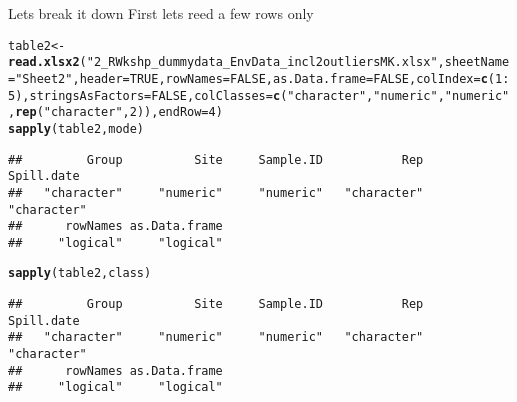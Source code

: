 \documentclass{article}\usepackage[]{graphicx}\usepackage[]{color}
\makeatletter
\newcommand{\hlnum}[1]{\textcolor[rgb]{0.686,0.059,0.569}{#1}}%
\newcommand{\hlstr}[1]{\textcolor[rgb]{0.192,0.494,0.8}{#1}}%
\newcommand{\hlopt}[1]{\textcolor[rgb]{0,0,0}{#1}}%
\newcommand{\hlstd}[1]{\textcolor[rgb]{0.345,0.345,0.345}{#1}}%
\newcommand{\hlkwb}[1]{\textcolor[rgb]{0.69,0.353,0.396}{#1}}%
\newcommand{\hlkwc}[1]{\textcolor[rgb]{0.333,0.667,0.333}{#1}}%
\newcommand{\hlkwd}[1]{\textcolor[rgb]{0.737,0.353,0.396}{\textbf{#1}}}%
\newenvironment{kframe}{%
 \def\at@end@of@kframe{}%
 \ifinner\ifhmode%
  \def\at@end@of@kframe{\end{minipage}}%
  \begin{minipage}{\columnwidth}%
 \fi\fi%
 \def\FrameCommand##1{\hskip\@totalleftmargin \hskip-\fboxsep
 \colorbox{shadecolor}{##1}\hskip-\fboxsep
     \hskip-\linewidth \hskip-\@totalleftmargin \hskip\columnwidth}%
 \MakeFramed {\advance\hsize-\width
   \@totalleftmargin\z@ \linewidth\hsize
   \@setminipage}}%
 {\par\unskip\endMakeFramed%
 \at@end@of@kframe}
\newenvironment{knitrout}{}{} %
\makeatother
\begin{document}
\begin{frame}[fragile]
\begin{block}{Lets break it down}
First lets reed a few rows only
\end{block}
\begin{knitrout}
\color{fgcolor}\begin{kframe}
\begin{alltt}
\hlstd{table2}\hlkwb{<-}\hlkwd{read.xlsx2}\hlstd{(}\hlstr{"2_R Wkshp_dummy data_Env Data_incl2outliersMK.xlsx"}\hlstd{,} \hlkwc{sheetName} \hlstd{=} \hlstr{"Sheet2"}\hlstd{,}\hlkwc{header}\hlstd{=}\hlnum{TRUE}\hlstd{,}\hlkwc{rowNames}\hlstd{=}\hlnum{FALSE}\hlstd{,}\hlkwc{as.Data.frame}\hlstd{=}\hlnum{FALSE}\hlstd{,}\hlkwc{colIndex}\hlstd{=}\hlkwd{c}\hlstd{(}\hlnum{1}\hlopt{:}\hlnum{5}\hlstd{),}\hlkwc{stringsAsFactors}\hlstd{=}\hlnum{FALSE}\hlstd{,}\hlkwc{colClasses}\hlstd{=}\hlkwd{c}\hlstd{(}\hlstr{"character"}\hlstd{,}\hlstr{"numeric"}\hlstd{,}\hlstr{"numeric"}\hlstd{,}\hlkwd{rep}\hlstd{(}\hlstr{"character"}\hlstd{,}\hlnum{2}\hlstd{)),}\hlkwc{endRow}\hlstd{=}\hlnum{4}\hlstd{)}
\hlkwd{sapply}\hlstd{(table2,mode)}
\end{alltt}
\begin{verbatim}
##         Group          Site     Sample.ID           Rep    Spill.date 
##   "character"     "numeric"     "numeric"   "character"   "character" 
##      rowNames as.Data.frame 
##     "logical"     "logical"
\end{verbatim}
\begin{alltt}
\hlkwd{sapply}\hlstd{(table2,class)}
\end{alltt}
\begin{verbatim}
##         Group          Site     Sample.ID           Rep    Spill.date 
##   "character"     "numeric"     "numeric"   "character"   "character" 
##      rowNames as.Data.frame 
##     "logical"     "logical"
\end{verbatim}
\end{kframe}
\end{knitrout}
\clearpage
\end{frame}
\end{document}
